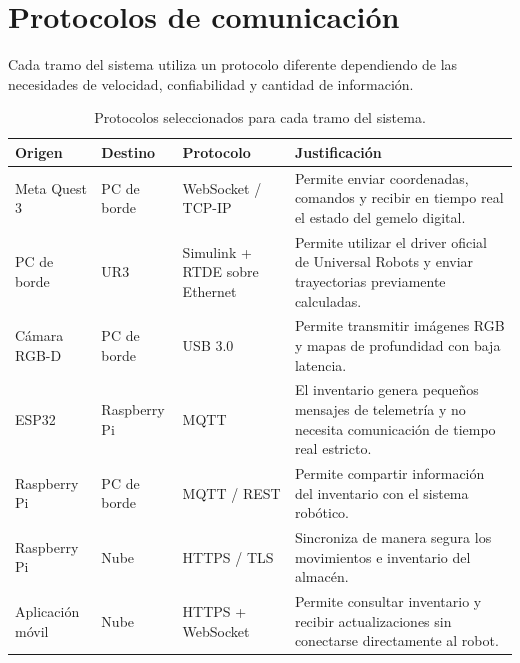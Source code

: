\documentclass[12pt,letterpaper]{article}
\begin{document}
\section{Protocolos de comunicación}

Cada tramo del sistema utiliza un protocolo diferente dependiendo de
las necesidades de velocidad, confiabilidad y cantidad de información.

\begin{table}[H]
\centering
\small
\renewcommand{\arraystretch}{1.4}

\begin{tabularx}{\textwidth}{
    >{\raggedright\arraybackslash}p{3.1cm}
    >{\raggedright\arraybackslash}p{3.3cm}
    >{\raggedright\arraybackslash}p{2.8cm}
    X
}

\toprule
\textbf{Origen} &
\textbf{Destino} &
\textbf{Protocolo} &
\textbf{Justificación} \\
\midrule

Meta Quest 3 &
PC de borde &
WebSocket / TCP-IP &
Permite enviar coordenadas, comandos y recibir en tiempo real el estado del gemelo digital. \\

PC de borde &
UR3 &
Simulink + RTDE sobre Ethernet &
Permite utilizar el driver oficial de Universal Robots y enviar trayectorias previamente calculadas. \\

Cámara RGB-D &
PC de borde &
USB 3.0 &
Permite transmitir imágenes RGB y mapas de profundidad con baja latencia. \\

ESP32 &
Raspberry Pi &
MQTT &
El inventario genera pequeños mensajes de telemetría y no necesita comunicación de tiempo real estricto. \\

Raspberry Pi &
PC de borde &
MQTT / REST &
Permite compartir información del inventario con el sistema robótico. \\

Raspberry Pi &
Nube &
HTTPS / TLS &
Sincroniza de manera segura los movimientos e inventario del almacén. \\

Aplicación móvil &
Nube &
HTTPS + WebSocket &
Permite consultar inventario y recibir actualizaciones sin conectarse directamente al robot. \\

\bottomrule
\end{tabularx}

\caption{Protocolos seleccionados para cada tramo del sistema.}

\end{table}
\end{document}
